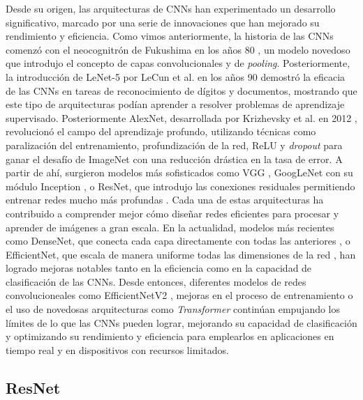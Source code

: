 Desde su origen, las arquitecturas de CNNs han experimentado un desarrollo significativo,
marcado por una serie de innovaciones que han mejorado su rendimiento y
eficiencia. Como vimos anteriormente, la historia de las CNNs comenzó con el
neocognitrón de Fukushima en los años 80 \cite{fukushima1980neocognitron}, un modelo
novedoso que introdujo el concepto de capas convolucionales y de \textit{pooling}.
Posteriormente, la introducción de LeNet-5 por LeCun et al. en los años 90 \cite{lecun1998gradient}
demostró la eficacia de las CNNs en tareas de reconocimiento de dígitos y documentos,
mostrando que este tipo de arquitecturas podían aprender a resolver problemas de
aprendizaje supervisado. Posteriormente AlexNet, desarrollada por Krizhevsky et
al. en 2012 \cite{krizhevsky2012imagenet}, revolucionó el campo del aprendizaje
profundo, utilizando técnicas como paralización del entrenamiento,
profundización de la red, ReLU y \textit{dropout} para ganar el desafío de
ImageNet con una reducción drástica en la tasa de error. A partir de ahí,
surgieron modelos más sofisticados como VGG \cite{simonyan2014very}, GoogLeNet con
su módulo Inception \cite{szegedy2015going}, o ResNet, que introdujo las conexiones
residuales permitiendo entrenar redes mucho más profundas \cite{he2016deep}.
Cada una de estas arquitecturas ha contribuido a comprender mejor cómo diseñar
redes eficientes para procesar y aprender de imágenes a gran escala. En la actualidad,
modelos más recientes como DenseNet, que conecta cada capa directamente con todas
las anteriores \cite{huang2017densely}, o EfficientNet, que escala de manera uniforme
todas las dimensiones de la red \cite{tan2019efficientnet}, han logrado mejoras
notables tanto en la eficiencia como en la capacidad de clasificación de las
CNNs. Desde entonces, diferentes modelos de redes convolucioneales como
EfficientNetV2 \cite{tan2021efficientnetv2smallermodelsfaster}, mejoras en el proceso
de entrenamiento \cite{pham2021metapseudolabels} o el uso de novedosas arquitecturas
como \textit{Transformer}
\cite{NIPS2017_3f5ee243, dosovitskiy2021imageworth16x16words} continúan
empujando los límites de lo que las CNNs pueden lograr, mejorando su capacidad de
clasificación y optimizando su rendimiento y eficiencia para emplearlos en aplicaciones
en tiempo real y en dispositivos con recursos limitados.

\subsection{ResNet}

